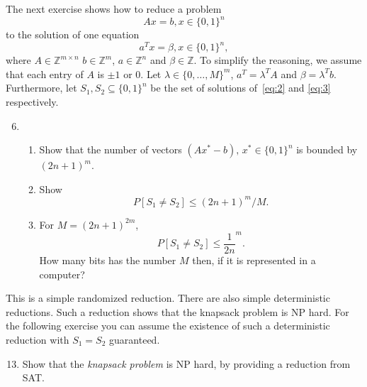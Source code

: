 \documentclass[11pt,a4paper]{article}
\begin{document}
\noindent 
The next exercise shows how to reduce a problem 
\begin{equation} 
  \label{eq:2}
  A x = b, x ∈ \{0,1\}^n   
\end{equation}
to the solution of one equation
\begin{equation}
  \label{eq:3}
   a^T x = β, x ∈ \{0,1\}^n,   
 \end{equation}
 where $A ∈ℤ^{m ×n}$ $b ∈ℤ^m$, $a ∈ℤ^n$ and $β ∈ℤ$. To simplify the reasoning, we assume that each entry of $A$ is $± 1$ or $0$.
 Let $λ ∈ \{ 0,\dots,M\} ^m$,  $a^T = λ^T A$ and $β = λ^T b$. Furthermore, let $S_1, S_2 ⊆ \{0,1\}^n$ be the set of solutions  of~\eqref{eq:2} and \eqref{eq:3} respectively.

 
 \begin{enumerate}
   \setcounter{enumi}{5}
   \begin{enumerate}
 \item  Show that $S_1 ⊆ S_2$ holds.
 \item An element $x^* ∈ \{0,1\}^n$ belongs to $S_2 ⧹S_1$ if and only if $λ ⊥ (A x^* -b)$.
 \item Suppose that $λ $ is chosen i.i.d. at random from $\{ 0,\dots,M\}$ and that $x^* ∈ \{0,1\}^n ⧹S_1$. Show that
   \begin{displaymath}
     P\left[ λ ⊥ (A x^* -b) \right] ≤ 1/M. 
   \end{displaymath}
   
   \end{enumerate} 
   
 \item 
 \begin{enumerate}
 \item Show that the number of vectors $(A x^* -b), \, x^* ∈\{0,1\}^n$ is bounded by $(2 n +1)^m$.
 \item Show 
   \begin{displaymath}
     P \left[ S_1 ≠ S_2\right] ≤ (2 n +1)^m / M. 
   \end{displaymath}
 \item For $M = (2 n +1)^{2m}$,
   \begin{displaymath}
     P \left[ S_1 ≠ S_2\right] ≤ \frac{1}{2n}^m. 
   \end{displaymath}
   How many bits has the number $M$ then, if it is represented in a computer?
   \end{enumerate}
   \end{enumerate}

 \noindent 
 This is a simple randomized reduction. There are also simple deterministic reductions. Such a reduction shows that the knapsack problem is NP hard. For the following exercise you can assume the existence of such a deterministic reduction with $S_1 = S_2$ guaranteed.
 \begin{enumerate}
   \setcounter{enumi}{12}
\item    Show that the \emph{knapsack problem} is NP hard, by providing a reduction from SAT. 
 \end{enumerate}
 
 

%
%


 
\end{document}
